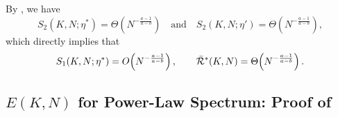 


By , we have
\[
S_2(K,N;\eta^*)=\Theta\!\left(N^{-\frac{a-1}{a-b}}\right)
\quad\text{and}\quad
S_2(K,N;\eta')=\Theta\!\left(N^{-\frac{a-1}{a-b}}\right),
\]
which directly implies that
\[
S_1(K,N;\eta^*)=O\!\left(N^{-\frac{a-1}{a-b}}\right),
\qquad
\Bar{\mathcal{R}}^*(K,N)=\Theta\!\left(N^{-\frac{a-1}{a-b}}\right).
\]
\subsection{$E(K,N)$ for Power-Law Spectrum: Proof of } \label{sec:proof-one-hot-Ek-power-spectrum}
